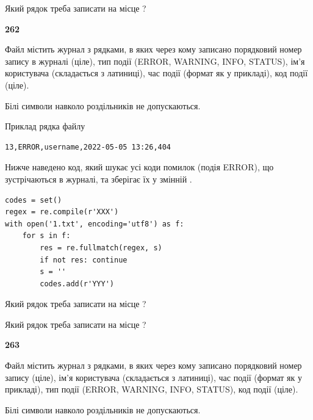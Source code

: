 Який рядок треба записати на місце  ?\par


\newpage

{\begin {center}\textbf{ 262}\end {center}}\par
Файл  містить журнал з рядками, в яких через кому записано поряд\-ко\-вий номер запису в журналі (ціле), тип події (ERROR, WARNING, INFO, STATUS), ім'я користувача (складається з латиниці), час події (фор\-мат як у прикладі), код події (ціле).

Білі символи навколо роздільників не допускаються.

Приклад рядка файлу



\begin{verbatim}
13,ERROR,username,2022-05-05 13:26,404
\end{verbatim}


Нижче наведено код, який шукає усі коди помилок (подія ERROR), що зустріча\-ють\-ся в журналі, та зберігає їх у змінній .



\begin{verbatim}
codes = set()
regex = re.compile(r'XXX')
with open('1.txt', encoding='utf8') as f:
    for s in f:
        res = re.fullmatch(regex, s)
        if not res: continue
        s = ''
        codes.add(r'YYY')
\end{verbatim}





Який рядок треба записати на місце  ?\par
\vspace{5mm}


Який рядок треба записати на місце  ?\par


\newpage

{\begin {center}\textbf{ 263}\end {center}}\par
Файл  містить журнал з рядками, в яких через кому записано поряд\-ко\-вий номер запису (ціле), ім'я користувача (складається з латиниці), час події (фор\-мат як у прикладі), тип події (ERROR, WARNING, INFO, STATUS), код події (ціле).

Білі символи навколо роздільників не допускаються.

